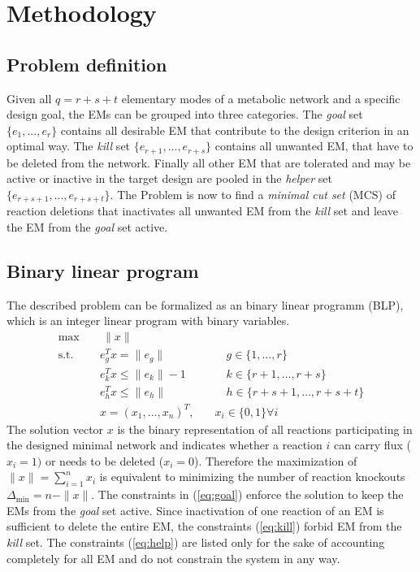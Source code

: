 \documentclass{llncs}
\begin{document}
\section{Methodology}
\subsection{Problem definition}
Given all $q = r+s+t$ elementary modes of a metabolic network and a specific design goal,
the EMs can be grouped into three categories.
The \emph{goal} set $\{e_{1}, ..., e_{r}\}$ contains all desirable EM that contribute 
to the design criterion in an optimal way.
The \emph{kill} set $\{e_{r+1}, ..., e_{r+s}\}$ contains all unwanted EM, 
that have to be deleted from the network.
Finally all other EM that are tolerated and may be active or inactive in 
the target design are pooled in the \emph{helper} set $\{e_{r+s+1}, ..., e_{r+s+t}\}$.
The Problem is now to find a \emph{minimal cut set} (MCS) of reaction deletions 
that inactivates all unwanted EM from the \emph{kill} set and leave the 
EM from the \emph{goal} set active.

\subsection{Binary linear program}
The described problem can be formalized as an binary linear programm (BLP), 
which is an integer linear program with binary variables.
\begin{subequations}
    \begin{align}
        \max \quad  & ~\|x\|    \label{eq:objfunc}\\
        \mbox{s.t.}\quad  & e^{T}_{g} x = \|e_{g}\| &\quad\quad g \in \{1, \dots, r\}   \label{eq:goal} \\
        & e^{T}_{k} x \leq \|e_{k}\|-1     &\quad\quad k \in \{r+1, \dots, r+s\}  \label{eq:kill} \\
        & e^{T}_{h} x \leq \|e_{h}\|       &\quad\quad h \in \{r+s+1, \dots, r+s+t\}  \label{eq:help} \\
        & x = (x_{1}, ..., x_{n})^{T}, &\quad x_{i} \in \{0, 1\} \forall i
        \end{align}
\end{subequations}
The solution vector $x$ is the binary representation of all reactions 
participating in the designed minimal network and indicates whether a reaction
$i$ can carry flux ($x_{i} = 1)$ or needs to be deleted ($x_{i} = 0$).
Therefore the maximization of $\|x\| = \sum_{i=1}^{n} x_{i}$ is equivalent
to minimizing the number of reaction knockouts $\Delta_{\min} = n - \|x\|$.
The constraints in (\ref{eq:goal}) enforce the solution to keep the 
EMs from the \emph{goal} set active. 
Since inactivation of one reaction of an EM is sufficient to delete the
entire EM, the constraints (\ref{eq:kill}) forbid EM from the \emph{kill} set.
The constraints (\ref{eq:help}) are listed only for the sake of accounting completely for all EM
and do not constrain the system in any way.
 
\end{document}
